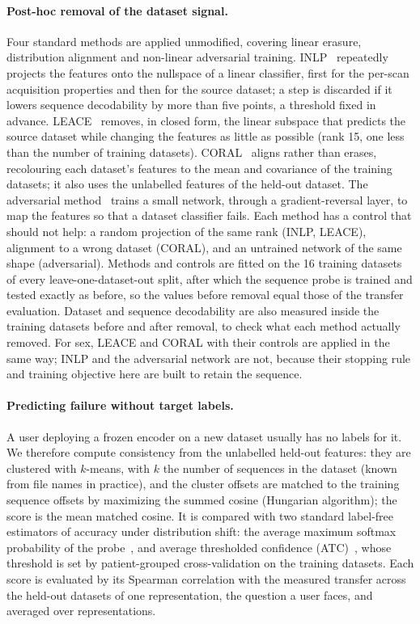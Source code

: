 \documentclass[11pt]{article}
\begin{document}
\paragraph{Post-hoc removal of the dataset signal.}
Four standard methods are applied unmodified, covering linear erasure,
distribution alignment and non-linear adversarial training.
INLP~\cite{ravfogel_null_2020} repeatedly projects the features onto the
nullspace of a linear classifier, first for the per-scan acquisition
properties and then for the source dataset; a step is discarded if it lowers
sequence decodability by more than five points, a threshold fixed in
advance. LEACE~\cite{belrose_leace_2023} removes, in closed form, the linear
subspace that predicts the source dataset while changing the features as
little as possible (rank 15, one less than the number of training datasets).
CORAL~\cite{sun_deep_2016} aligns rather than erases, recolouring each
dataset's features to the mean and covariance of the training datasets; it
also uses the unlabelled features of the held-out dataset. The adversarial
method~\cite{ganin_domain-adversarial_2016, dinsdale_deep_2021} trains a
small network, through a gradient-reversal layer, to map the features so
that a dataset classifier fails. Each method has a control that should not
help: a random projection of the same rank (INLP, LEACE), alignment to a
wrong dataset (CORAL), and an untrained network of the same shape
(adversarial). Methods and controls are fitted on the 16 training datasets of
every leave-one-dataset-out split, after which the sequence probe is trained
and tested exactly as before, so the values before removal equal those of the
transfer evaluation. Dataset and sequence decodability are also measured
inside the training datasets before and after removal, to check what each
method actually removed. For sex, LEACE and CORAL with their controls are
applied in the same way; INLP and the adversarial network are not, because
their stopping rule and training objective here are built to retain the
sequence.

\paragraph{Predicting failure without target labels.}
A user deploying a frozen encoder on a new dataset usually has no labels for
it. We therefore compute consistency from the unlabelled held-out features:
they are clustered with $k$-means, with $k$ the number of sequences in the
dataset (known from file names in practice), and the cluster offsets are
matched to the training sequence offsets by maximizing the summed cosine
(Hungarian algorithm); the score is the mean matched cosine. It is compared
with two standard label-free estimators of accuracy under distribution shift:
the average maximum softmax probability of the
probe~\cite{hendrycks_baseline_2017}, and average thresholded confidence
(ATC)~\cite{garg_leveraging_2022}, whose threshold is set by patient-grouped
cross-validation on the training datasets. Each score is evaluated by its
Spearman correlation with the measured transfer across the held-out datasets
of one representation, the question a user faces, and averaged over
representations.
\end{document}
